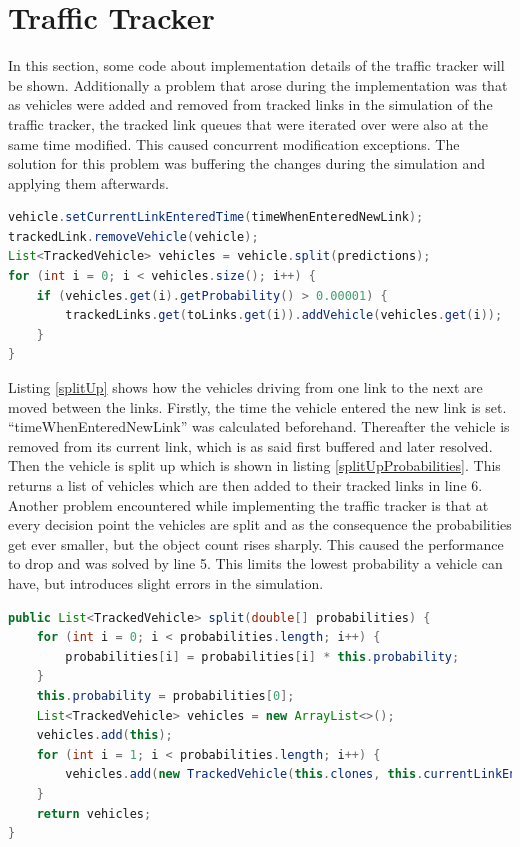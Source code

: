 \section{Traffic Tracker}

In this section, some code about implementation details of the traffic tracker will be shown. Additionally a problem that arose during the implementation was that as vehicles were added and removed from tracked links in the simulation of the traffic tracker, the tracked link queues that were iterated over were also at the same time modified. This caused concurrent modification exceptions. The solution for this problem was buffering the changes during the simulation and applying them afterwards.

\vspace{0.5em}

\begin{lstlisting}[caption={Split Up Vehicle to Multiple Links}, label=splitUp, language=Java]
vehicle.setCurrentLinkEnteredTime(timeWhenEnteredNewLink);
trackedLink.removeVehicle(vehicle);
List<TrackedVehicle> vehicles = vehicle.split(predictions);
for (int i = 0; i < vehicles.size(); i++) {
	if (vehicles.get(i).getProbability() > 0.00001) {
		trackedLinks.get(toLinks.get(i)).addVehicle(vehicles.get(i));
	}
}
\end{lstlisting}

Listing \ref{splitUp} shows how the vehicles driving from one link to the next are moved between the links. Firstly, the time the vehicle entered the new link is set. ``timeWhenEnteredNewLink'' was calculated beforehand. Thereafter the vehicle is removed from its current link, which is as said first buffered and later resolved. Then the vehicle is split up which is shown in listing \ref{splitUpProbabilities}. This returns a list of vehicles which are then added to their tracked links in line 6. Another problem encountered while implementing the traffic tracker is that at every decision point the vehicles are split and as the consequence the probabilities get ever smaller, but the object count rises sharply. This caused the performance to drop and was solved by line 5. This limits the lowest probability a vehicle can have, but introduces slight errors in the simulation.

\vspace{0.5em}

\begin{lstlisting}[caption={Split Up Vehicle Probabilities}, label=splitUpProbabilities, language=Java]
public List<TrackedVehicle> split(double[] probabilities) {
	for (int i = 0; i < probabilities.length; i++) {
		probabilities[i] = probabilities[i] * this.probability;
	}
	this.probability = probabilities[0];
	List<TrackedVehicle> vehicles = new ArrayList<>();
	vehicles.add(this);
	for (int i = 1; i < probabilities.length; i++) {
		vehicles.add(new TrackedVehicle(this.clones, this.currentLinkEnteredTime, probabilities[i]));
	}
	return vehicles;
}
\end{lstlisting}

